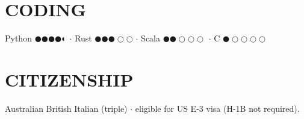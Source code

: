 \documentclass[line, margin]{res}
\newcommand{\Cpp}{C\nolinebreak\hspace{-.05em}\raisebox{.3ex}{\scriptsize\bf ++}}
\begin{document}
\begin{resume}

\section{CODING}

{\sf Python} $\CIRCLE \CIRCLE \CIRCLE \CIRCLE \LEFTcircle$ $\cdot$ {\sf Rust} $\CIRCLE \CIRCLE \CIRCLE \Circle \Circle$ $\cdot$ {\sf Scala} $\CIRCLE \CIRCLE \Circle \Circle \Circle$ $\cdot$ {\sf \Cpp} $\CIRCLE \Circle \Circle \Circle \Circle$

\section{CITIZENSHIP}

  \textsf{Australian}  \textsf{British}  \textsf{Italian} (triple) $\cdot$ eligible for  \textsf{US E-3} visa (\textsf{H-1B} not required).

\end{resume}
\end{document}
